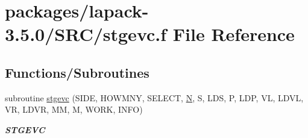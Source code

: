 \hypertarget{stgevc_8f}{}\section{packages/lapack-\/3.5.0/\+S\+R\+C/stgevc.f File Reference}
\label{stgevc_8f}
\subsection*{Functions/\+Subroutines}
\begin{DoxyCompactItemize}
\item 
subroutine \hyperlink{group__realGEcomputational_ga2e9d9ccc8569cb5d6e38371c61c37de1}{stgevc} (S\+I\+D\+E, H\+O\+W\+M\+N\+Y, S\+E\+L\+E\+C\+T, \hyperlink{polmisc_8c_a0240ac851181b84ac374872dc5434ee4}{N}, S, L\+D\+S, P, L\+D\+P, V\+L, L\+D\+V\+L, V\+R, L\+D\+V\+R, M\+M, M, W\+O\+R\+K, I\+N\+F\+O)
\begin{DoxyCompactList}\small\item\em {\bfseries S\+T\+G\+E\+V\+C} \end{DoxyCompactList}\end{DoxyCompactItemize}
